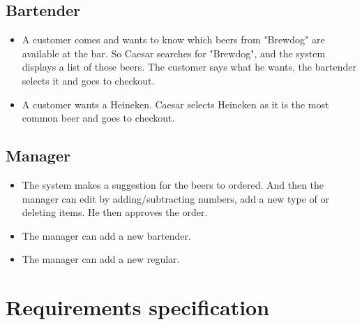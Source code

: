 \documentclass{article}
\begin{document}
\subsection{Bartender}

\begin{itemize}
\item A customer comes and wants to know which beers from "Brewdog" are available at the bar. So Caesar searches for "Brewdog", and the system displays a list of these beers. The customer says what he wants, the bartender selects it and goes to checkout.
\item A customer wants a Heineken. Caesar selects Heineken as it is the most common beer and goes to checkout.

\end{itemize}
\subsection{Manager}

\begin{itemize}
\item The system makes a suggestion for the beers to ordered. And then the manager can edit by adding/subtracting numbers, add a new type of or deleting items. He then approves the order.
\item The manager can add a new bartender.
\item The manager can add a new regular.

\end{itemize}
\section{Requirements specification}
\end{document}
